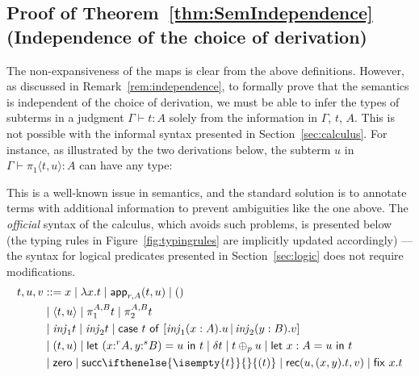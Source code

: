 \documentclass[a4paper,UKenglish,cleveref, autoref, thm-restate]{lipics-v2021}
\providecommand*{\ifempty}[3]{\ifthenelse{\isempty{#1}}{#2}{#3}}
\newcommand{\parensmathoper}[2]{\ensuremath{#1\ifempty{#2}{}{(#2)}}}
\newcommand{\inj}{\mathsf{\mathit{inj}}}
\newcommand{\infrule}[3][]{\infer[{\ifempty{#1}{}{(\textsc{#1})\;}}]{#3}{#2}}
\newcommand{\ts}{\vdash}
\newcommand{\hastype}[3]{#1\ts #2 : #3}
\newcommand{\letIn}[2]{\mathsf{let~} #1 \mathsf{~in~} #2}
\newcommand{\fix}[2]{\mathsf{fix~} #1 . #2 }
\newcommand{\Zero}{\mathsf{zero}}
\newcommand{\Succ}{\parensmathoper{\mathsf{succ}}}
\newcommand{\Rec}[3]{\mathsf{rec}(#1,#2,#3)}
\newcommand{\tuple}[1]{\langle #1 \rangle}
\newcommand{\case}[5]{\mathsf{case~} #1%
    \mathsf{~of~} [\inj_1 #2 . #3 \,|\, \inj_2 #4 . #5]%
}
\begin{document}
\subsection*{Proof of Theorem~\ref{thm:SemIndependence} (Independence of the choice of derivation)}
The non-expansiveness of the maps is clear from the above definitions. 
However, as discussed in Remark~\ref{rem:independence}, to formally prove that the semantics is independent of the choice of derivation, 
we must be able to infer the types of subterms in a judgment $\hastype{\Gamma}{t}{A}$ solely from the information in $\Gamma$, $t$, $A$. 
This is not possible with the informal syntax presented in Section~\ref{sec:calculus}. For instance, as illustrated by the two derivations below, 
the subterm $u$ in $\hastype{\Gamma}{\pi_1\tuple{t,u}}{A}$ can have any type:
This is a well-known issue in semantics, and the standard solution is to annotate terms with additional information to prevent ambiguities like the one above. The \emph{official} syntax of the calculus, which avoids such problems, is presented below (the typing rules in Figure~\ref{fig:typingrules} are implicitly updated accordingly) 
---the syntax for logical predicates presented in Section~\ref{sec:logic} does not require modifications.
\newcommand{\app}[4]{\mathsf{app}_{#1,#2}(#3,#4)}
\begin{align*}
 t, u, v &{} ::= {}
  x \mid \lambda x. t \mid \app rAtu \mid () \\
 &\mid \tuple{t,u} \mid \pi^{A,B}_1 t \mid \pi^{A,B}_2 t \\
 &\mid \inj_1 t \mid \inj_2 t \mid \case{t}{(x:A)}{u}{(y:B)}{v}
 \\
 &\mid  (t,u) \mid \letIn{(x{:^r}A,y{:^s}B) = u }{t} %
 \mid \delta t \mid  t \oplus_p u \mid \letIn{x:A = u}{t} \\
 &\mid \Zero \mid \Succ{t} \mid \Rec{u}{(x,y).t}{v} %
 \mid \fix{x}{t}
\end{align*}
\end{document}

